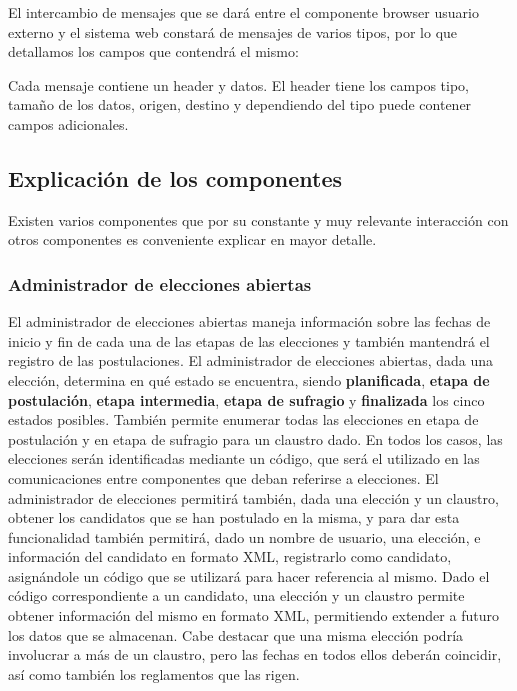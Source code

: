 El intercambio de mensajes que se dará entre el componente browser usuario externo y el sistema web constará de mensajes de varios tipos, por lo que detallamos los campos que contendrá el mismo:

Cada mensaje contiene un header y datos. El header tiene los campos tipo, tamaño de los datos, origen, destino y dependiendo del tipo puede contener campos adicionales. 

\subsection{Explicación de los componentes}

Existen varios componentes que por su constante y muy relevante interacción con otros componentes es conveniente explicar en mayor detalle.

\subsubsection{Administrador de elecciones abiertas}

\label{admin_elecciones}

El administrador de elecciones abiertas maneja información sobre las fechas de inicio y fin de cada una de las etapas de las elecciones y también mantendrá el registro de las postulaciones. 
El administrador de elecciones abiertas, dada una elección, determina en qué estado se encuentra, siendo {\bf planificada}, {\bf etapa de postulación}, {\bf etapa intermedia},  {\bf etapa de sufragio} y {\bf finalizada} los cinco estados posibles. También permite enumerar todas las elecciones en etapa de postulación y en etapa de sufragio para un claustro dado. En todos los casos, las elecciones serán identificadas mediante un código, que será el utilizado en las comunicaciones entre componentes que deban referirse a elecciones.
El administrador de elecciones permitirá también, dada una elección y un claustro, obtener los candidatos que se han postulado en la misma, y para dar esta funcionalidad también permitirá, dado un nombre de usuario, una elección, e información del candidato en formato XML, registrarlo como candidato, asignándole un código que se utilizará para hacer referencia al mismo.
Dado el código correspondiente a un candidato, una elección y un claustro permite obtener información del mismo en formato XML, permitiendo extender a futuro los datos que se almacenan. 
Cabe destacar que una misma elección podría involucrar a más de un claustro, pero las fechas en todos ellos deberán coincidir, así como también los reglamentos que las rigen.

